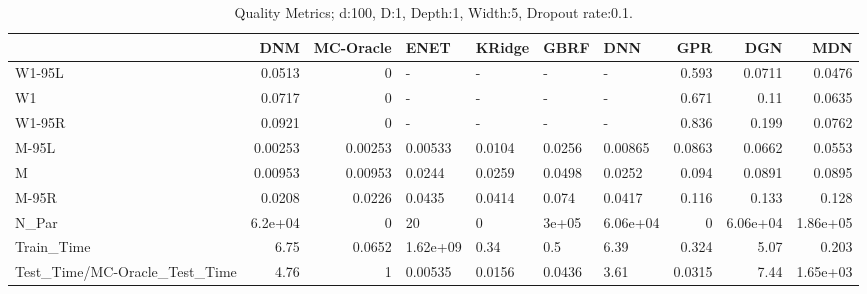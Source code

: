 \begin{table}
\centering
\caption{Quality Metrics; d:100, D:1, Depth:1, Width:5, Dropout rate:0.1.}
\begin{tabular}{lrrllllrrr}
\toprule
{} &     DNM &  MC-Oracle &     ENET & KRidge &   GBRF &      DNN &    GPR &      DGN &      MDN \\
\midrule
W1-95L                        &  0.0513 &          0 &        - &      - &      - &        - &  0.593 &   0.0711 &   0.0476 \\
W1                            &  0.0717 &          0 &        - &      - &      - &        - &  0.671 &     0.11 &   0.0635 \\
W1-95R                        &  0.0921 &          0 &        - &      - &      - &        - &  0.836 &    0.199 &   0.0762 \\
M-95L                         & 0.00253 &    0.00253 &  0.00533 & 0.0104 & 0.0256 &  0.00865 & 0.0863 &   0.0662 &   0.0553 \\
M                             & 0.00953 &    0.00953 &   0.0244 & 0.0259 & 0.0498 &   0.0252 &  0.094 &   0.0891 &   0.0895 \\
M-95R                         &  0.0208 &     0.0226 &   0.0435 & 0.0414 &  0.074 &   0.0417 &  0.116 &    0.133 &    0.128 \\
N\_Par                         & 6.2e+04 &          0 &       20 &      0 &  3e+05 & 6.06e+04 &      0 & 6.06e+04 & 1.86e+05 \\
Train\_Time                    &    6.75 &     0.0652 & 1.62e+09 &   0.34 &    0.5 &     6.39 &  0.324 &     5.07 &    0.203 \\
Test\_Time/MC-Oracle\_Test\_Time &    4.76 &          1 &  0.00535 & 0.0156 & 0.0436 &     3.61 & 0.0315 &     7.44 & 1.65e+03 \\
\bottomrule
\end{tabular}
\end{table}
